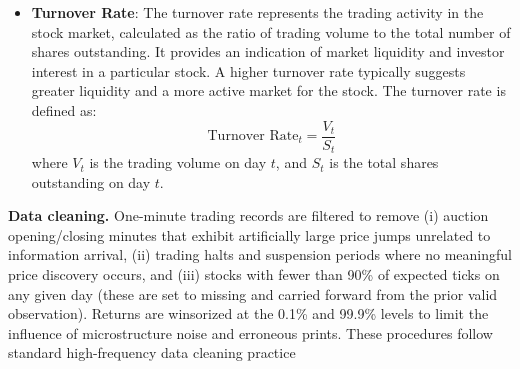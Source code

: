 \documentclass[preprint,12pt,authoryear]{elsarticle}
\renewcommand{\textcolor}[2]{\begingroup\color{#1}#2\endgroup}
\begin{document}
\begin{itemize}
    \item \textbf{Turnover Rate}: The turnover rate represents the trading activity in the stock market, calculated as the ratio of trading volume to the total number of shares outstanding. It provides an indication of market liquidity and investor interest in a particular stock. A higher turnover rate typically suggests greater liquidity and a more active market for the stock. The turnover rate is defined as:
    \[
    \text{Turnover Rate}_t = \frac{V_t}{S_t}
    \]
    where $V_t$ is the trading volume on day $t$, and $S_t$ is the total shares outstanding on day $t$.
\end{itemize}

\par
\textcolor{red}{\textbf{Data cleaning.} One-minute trading records are filtered to remove (i) auction opening/closing minutes that exhibit artificially large price jumps unrelated to information arrival, (ii) trading halts and suspension periods where no meaningful price discovery occurs, and (iii) stocks with fewer than 90\% of expected ticks on any given day (these are set to missing and carried forward from the prior valid observation). Returns are winsorized at the 0.1\% and 99.9\% levels to limit the influence of microstructure noise and erroneous prints. These procedures follow standard high-frequency data cleaning practice \citep{fan2019measurement}}

\begin{table}[h]
  \centering
  \caption{Descriptive Statistics}
  \label{tab:descriptive_stats_transposed}
\end{table}
\end{document}
